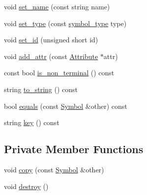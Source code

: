 \begin{DoxyCompactItemize}
\item 
void \hyperlink{classgenevalmag_1_1Symbol_a257b4ff2e26d8c15d33e9ac6194f44fb}{set\_\-name} (const string name)
\item 
void \hyperlink{classgenevalmag_1_1Symbol_a3c15ef8b10ef26b663a6eca6c2b81d7f}{set\_\-type} (const \hyperlink{namespacegenevalmag_a4c1cf205cb145b09e46df5277bcc70c6}{symbol\_\-type} type)
\item 
void \hyperlink{classgenevalmag_1_1Symbol_a997ca15803cde32380834a029d3609a7}{set\_\-id} (unsigned short id)
\item 
void \hyperlink{classgenevalmag_1_1Symbol_a41ceb415014d2cfbb5976c3fd2bbf35f}{add\_\-attr} (const \hyperlink{classgenevalmag_1_1Attribute}{Attribute} $\ast$attr)
\item 
const bool \hyperlink{classgenevalmag_1_1Symbol_ad44a494066886a7b83d4052367e8903b}{is\_\-non\_\-terminal} () const 
\item 
string \hyperlink{classgenevalmag_1_1Symbol_a5f1d632b5fc5e04c731f3478fe90df18}{to\_\-string} () const 
\item 
bool \hyperlink{classgenevalmag_1_1Symbol_a17e303be01f4c9cd3c1b167179d6e0aa}{equals} (const \hyperlink{classgenevalmag_1_1Symbol}{Symbol} \&other) const 
\item 
string \hyperlink{classgenevalmag_1_1Symbol_aab0679bd9e80cc86a1c6fccca3a4753c}{key} () const 
\end{DoxyCompactItemize}
\subsection*{Private Member Functions}
\begin{DoxyCompactItemize}
\item 
void \hyperlink{classgenevalmag_1_1Symbol_ab5a286e23bc3f9eaecb153f829bf0b4a}{copy} (const \hyperlink{classgenevalmag_1_1Symbol}{Symbol} \&other)
\item 
void \hyperlink{classgenevalmag_1_1Symbol_a6c95a923ca2c9d07903fca9b0bd4cacb}{destroy} ()
\end{DoxyCompactItemize}
